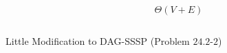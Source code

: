 
\begin{frame}{}
  \begin{columns}
      
  \end{columns}

  \pause
  \vspace{0.60cm}
  \[
    \Theta(V + E)
  \]
\end{frame}

\begin{frame}{}
  \begin{columns}
      
      
  \end{columns}

  \vspace{0.80cm}

\end{frame}

\begin{frame}{}
  \begin{exampleblock}{Little Modification to \textsc{DAG-SSSP} (Problem $24.2$-$2$)}
    \begin{columns}
	
    \end{columns}
  \end{exampleblock}
\end{frame}
